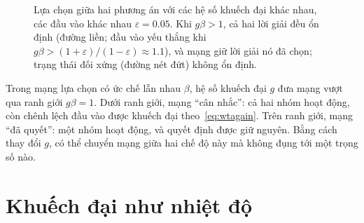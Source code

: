 \begin{figure}[t]
\centering
{}
\caption{Lựa chọn giữa hai phương án với các hệ số khuếch đại khác nhau, các đầu vào khác nhau $\varepsilon=0.05$. Khi $g\beta>1$, cả hai lời giải đều ổn định (đường liền; đầu vào yếu thắng khi $g\beta>(1+\varepsilon)/(1-\varepsilon)\approx1.1$), và mạng giữ lời giải nó đã chọn; trạng thái đối xứng (đường nét đứt) không ổn định.}
\label{fig:pitchfork}
\end{figure}

\begin{keyblock}
\begin{proposition}
\label{prop:gainwta}
Trong mạng lựa chọn có ức chế lẫn nhau $\beta$, hệ số khuếch đại $g$ đưa mạng vượt qua ranh giới $g\beta=1$. Dưới ranh giới, mạng ``cân nhắc'': cả hai nhóm hoạt động, còn chênh lệch đầu vào được khuếch đại theo~\eqref{eq:wtagain}. Trên ranh giới, mạng ``đã quyết'': một nhóm hoạt động, và quyết định được giữ nguyên. Bằng cách thay đổi $g$,  có thể chuyển mạng giữa hai chế độ này mà không đụng tới một trọng số nào.
\end{proposition}
\end{keyblock}

\section{Khuếch đại như nhiệt độ}

